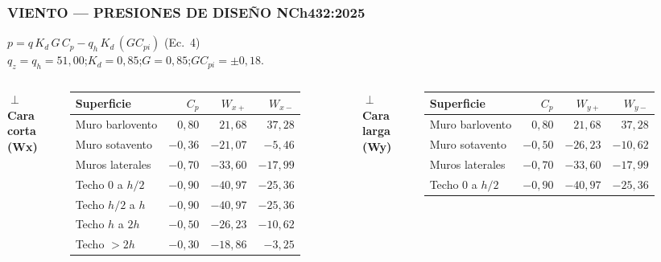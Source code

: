 \documentclass[11.5pt,aspectratio=169,handout]{beamer}
\newcommand{\ctitle}[1]{\frametitle{#1}}
\begin{document}
\begin{frame}
\ctitle{VIENTO --- PRESIONES DE DISEÑO NCh432:2025}
\vspace{-2mm}
\begin{center}
  {\scriptsize $p = q\,K_d\,G\,C_p - q_h\,K_d\,(GC_{pi})$ \quad (Ec.~4)}\\[1mm]
  {\scriptsize $q_z = q_h = 51{,}00$;\quad $K_d = 0{,}85$;\quad $G = 0{,}85$;\quad $GC_{pi} = \pm0{,}18$.}
\end{center}
\vspace{1mm}
\begin{columns}[T,totalwidth=\textwidth]
  \centering
  {\footnotesize\textbf{$\perp$ Cara corta (Wx)}}\\[1.5mm]
  {\scriptsize
  \begin{tabular}{@{}lrrr@{}}
    \toprule
    Superficie & $C_p$ & $W_{x+}$ & $W_{x-}$ \\
    \midrule
    Muro barlovento & $0{,}80$  & $21{,}68$  & $37{,}28$ \\
    Muro sotavento  & $-0{,}36$ & $-21{,}07$ & $-5{,}46$ \\
    Muros laterales & $-0{,}70$ & $-33{,}60$ & $-17{,}99$ \\
    Techo 0 a $h/2$ & $-0{,}90$ & $-40{,}97$ & $-25{,}36$ \\
    Techo $h/2$ a $h$ & $-0{,}90$ & $-40{,}97$ & $-25{,}36$ \\
    Techo $h$ a $2h$ & $-0{,}50$ & $-26{,}23$ & $-10{,}62$ \\
    Techo $> 2h$    & $-0{,}30$ & $-18{,}86$ & $-3{,}25$ \\
    \bottomrule
  \end{tabular}}
  \hfill
  \centering
  {\footnotesize\textbf{$\perp$ Cara larga (Wy)}}\\[1.5mm]
  {\scriptsize
  \begin{tabular}{@{}lrrr@{}}
    \toprule
    Superficie & $C_p$ & $W_{y+}$ & $W_{y-}$ \\
    \midrule
    Muro barlovento & $0{,}80$  & $21{,}68$  & $37{,}28$ \\
    Muro sotavento  & $-0{,}50$ & $-26{,}23$ & $-10{,}62$ \\
    Muros laterales & $-0{,}70$ & $-33{,}60$ & $-17{,}99$ \\
    Techo 0 a $h/2$ & $-0{,}90$ & $-40{,}97$ & $-25{,}36$ \\

\end{tabular}}
\end{columns}
\end{frame}
\end{document}
